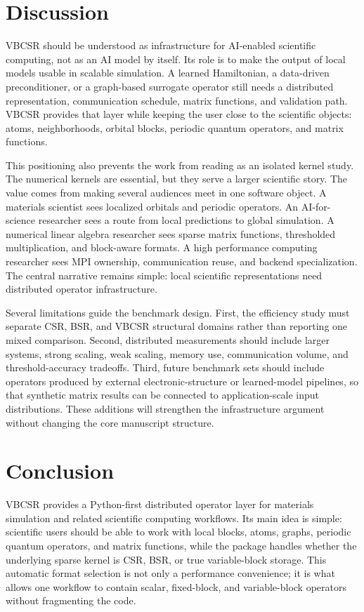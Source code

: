 \documentclass[
reprint,
superscriptaddress,
frontmatterverbose,
amsmath,amssymb,
pra,
]{revtex4-2}
\begin{document}
\section{Discussion}

VBCSR should be understood as infrastructure for AI-enabled scientific
computing, not as an AI model by itself.  Its role is to make the output of
local models usable in scalable simulation.  A learned Hamiltonian, a
data-driven preconditioner, or a graph-based surrogate operator still needs a
distributed representation, communication schedule, matrix functions, and
validation path.  VBCSR provides that layer while keeping the user close to the
scientific objects: atoms, neighborhoods, orbital blocks, periodic quantum
operators, and matrix functions.

This positioning also prevents the work from reading as an isolated kernel
study.  The numerical kernels are essential, but they serve a larger scientific
story.  The value comes from making several audiences meet in one software
object.  A materials scientist sees localized orbitals and periodic operators.
An AI-for-science researcher sees a route from local predictions to global
simulation.  A numerical linear algebra researcher sees sparse matrix
functions, thresholded multiplication, and block-aware formats.  A high
performance computing researcher sees MPI ownership, communication reuse, and
backend specialization.  The central narrative remains simple: local scientific
representations need distributed operator infrastructure.

Several limitations guide the benchmark design.  First, the efficiency study
must separate CSR, BSR, and VBCSR structural domains rather than reporting one
mixed comparison.  Second, distributed measurements should include larger
systems, strong scaling, weak scaling, memory use, communication volume, and
threshold-accuracy tradeoffs.  Third, future benchmark sets should include
operators produced by external electronic-structure or learned-model pipelines,
so that synthetic matrix results can be connected to application-scale input
distributions.  These additions will strengthen the infrastructure argument
without changing the core manuscript structure.

\section{Conclusion}

VBCSR provides a Python-first distributed operator layer for materials
simulation and related scientific computing workflows.  Its main idea is
simple: scientific users should be able to work with local blocks, atoms,
graphs, periodic quantum operators, and matrix functions, while the package handles
whether the underlying sparse kernel is CSR, BSR, or true variable-block
storage.  This automatic format selection is not only a performance
convenience; it is what allows one workflow to contain scalar, fixed-block, and
variable-block operators without fragmenting the code.
\end{document}
